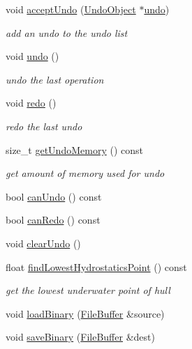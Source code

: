 \begin{DoxyCompactItemize}
void \hyperlink{classShipCAD_1_1ShipCADModel_a7e54e8d3a1b972014a3cd71cc57c74dc}{accept\+Undo} (\hyperlink{classShipCAD_1_1UndoObject}{Undo\+Object} $\ast$\hyperlink{classShipCAD_1_1ShipCADModel_a31cd6dcb665c21c1626599d57ae73684}{undo})
\begin{DoxyCompactList}\small\item\em add an undo to the undo list \end{DoxyCompactList}\item 
void \hyperlink{classShipCAD_1_1ShipCADModel_a31cd6dcb665c21c1626599d57ae73684}{undo} ()
\begin{DoxyCompactList}\small\item\em undo the last operation \end{DoxyCompactList}\item 
void \hyperlink{classShipCAD_1_1ShipCADModel_ac7f369ecf1a53a751f8774263d3ecd95}{redo} ()
\begin{DoxyCompactList}\small\item\em redo the last undo \end{DoxyCompactList}\item 
size\+\_\+t \hyperlink{classShipCAD_1_1ShipCADModel_a6fc43771e5ab6fe985ed894f4a1f779c}{get\+Undo\+Memory} () const 
\begin{DoxyCompactList}\small\item\em get amount of memory used for undo \end{DoxyCompactList}\item 
bool \hyperlink{classShipCAD_1_1ShipCADModel_a31d65b98d41ec379ae9f27b7cf66b079}{can\+Undo} () const 
\item 
bool \hyperlink{classShipCAD_1_1ShipCADModel_a1178d14769f22603340413c416d6631f}{can\+Redo} () const 
\item 
void \hyperlink{classShipCAD_1_1ShipCADModel_ac8a3a46ed5864f651495bd450d11ef2a}{clear\+Undo} ()
\item 
float \hyperlink{classShipCAD_1_1ShipCADModel_ab16487a794947608cace81a06552b2b1}{find\+Lowest\+Hydrostatics\+Point} () const 
\begin{DoxyCompactList}\small\item\em get the lowest underwater point of hull \end{DoxyCompactList}\item 
void \hyperlink{classShipCAD_1_1ShipCADModel_ad3e49bc04c73dc221e48d15974b68f41}{load\+Binary} (\hyperlink{classShipCAD_1_1FileBuffer}{File\+Buffer} \&source)
\item 
void \hyperlink{classShipCAD_1_1ShipCADModel_a64c7c4ddffffdd1be2f27eb4210af2b7}{save\+Binary} (\hyperlink{classShipCAD_1_1FileBuffer}{File\+Buffer} \&dest)

\end{DoxyCompactItemize}
